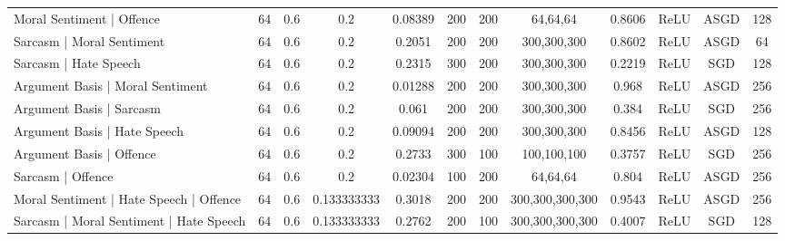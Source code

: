 \begin{landscape}
\begin{table}[]
{\begin{tabular}{l|ccccccccccc}
      Moral Sentiment | Offence                                          & 64         & 0.6              & 0.2              & 0.08389 & 200           & 200    & 64,64,64                & 0.8606        & ReLU          & ASGD      & 128        \\
      Sarcasm | Moral Sentiment                                          & 64         & 0.6              & 0.2              & 0.2051  & 200           & 200    & 300,300,300             & 0.8602        & ReLU          & ASGD      & 64         \\
      Sarcasm | Hate Speech                                              & 64         & 0.6              & 0.2              & 0.2315  & 300           & 200    & 300,300,300             & 0.2219        & ReLU          & SGD       & 128        \\
      Argument Basis | Moral Sentiment                                   & 64         & 0.6              & 0.2              & 0.01288 & 200           & 200    & 300,300,300             & 0.968         & ReLU          & ASGD      & 256        \\
      Argument Basis | Sarcasm                                           & 64         & 0.6              & 0.2              & 0.061   & 200           & 200    & 300,300,300             & 0.384         & ReLU          & SGD       & 256        \\
      Argument Basis | Hate Speech                                       & 64         & 0.6              & 0.2              & 0.09094 & 200           & 200    & 300,300,300             & 0.8456        & ReLU          & ASGD      & 128        \\
      Argument Basis | Offence                                           & 64         & 0.6              & 0.2              & 0.2733  & 300           & 100    & 100,100,100             & 0.3757        & ReLU          & SGD       & 256        \\
      Sarcasm | Offence                                                  & 64         & 0.6              & 0.2              & 0.02304 & 100           & 200    & 64,64,64                & 0.804         & ReLU          & ASGD      & 256        \\
      Moral Sentiment | Hate Speech | Offence                            & 64         & 0.6              & 0.133333333      & 0.3018  & 200           & 200    & 300,300,300,300         & 0.9543        & ReLU          & ASGD      & 256        \\
      Sarcasm | Moral Sentiment | Hate Speech                            & 64         & 0.6              & 0.133333333      & 0.2762  & 200           & 100    & 300,300,300,300         & 0.4007        & ReLU          & SGD       & 128        \\

\end{tabular}}
\end{table}
\end{landscape}
